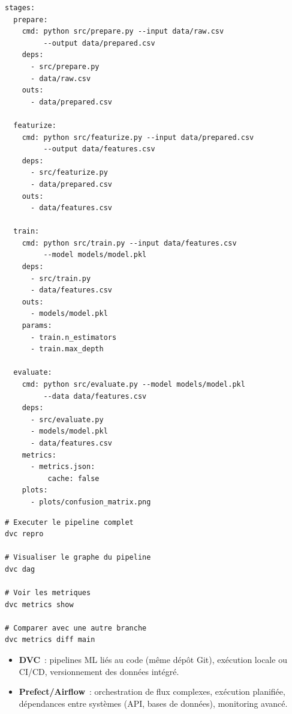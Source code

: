 \begin{codeblock}[title=\textbf{dvc.yaml --- Pipeline ML}]
\begin{verbatim}
stages:
  prepare:
    cmd: python src/prepare.py --input data/raw.csv
         --output data/prepared.csv
    deps:
      - src/prepare.py
      - data/raw.csv
    outs:
      - data/prepared.csv

  featurize:
    cmd: python src/featurize.py --input data/prepared.csv
         --output data/features.csv
    deps:
      - src/featurize.py
      - data/prepared.csv
    outs:
      - data/features.csv

  train:
    cmd: python src/train.py --input data/features.csv
         --model models/model.pkl
    deps:
      - src/train.py
      - data/features.csv
    outs:
      - models/model.pkl
    params:
      - train.n_estimators
      - train.max_depth

  evaluate:
    cmd: python src/evaluate.py --model models/model.pkl
         --data data/features.csv
    deps:
      - src/evaluate.py
      - models/model.pkl
      - data/features.csv
    metrics:
      - metrics.json:
          cache: false
    plots:
      - plots/confusion_matrix.png
\end{verbatim}
\end{codeblock}

\begin{codeblock}[title=\textbf{Commandes DVC pipelines}]
\begin{verbatim}
# Executer le pipeline complet
dvc repro

# Visualiser le graphe du pipeline
dvc dag

# Voir les metriques
dvc metrics show

# Comparer avec une autre branche
dvc metrics diff main
\end{verbatim}
\end{codeblock}

\begin{bonnepratique}[title=\textbf{Quand utiliser DVC vs Prefect/Airflow}]
\begin{itemize}
  \item \textbf{DVC}~: pipelines ML li\'es au code (m\^eme d\'ep\^ot Git),
    ex\'ecution locale ou CI/CD, versionnement des donn\'ees int\'egr\'e.
  \item \textbf{Prefect/Airflow}~: orchestration de flux complexes,
    ex\'ecution planifi\'ee, d\'ependances entre syst\`emes (API, bases de
    donn\'ees), monitoring avanc\'e.
\end{itemize}
\end{bonnepratique}

